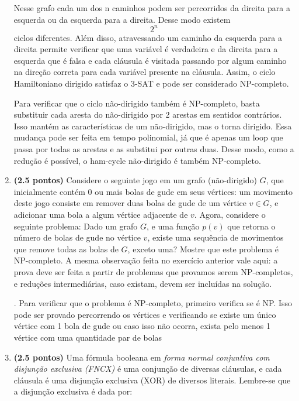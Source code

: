 \documentclass[12pt]{article}
\newcommand{\resposta}[1]{ \noindent {\bf Solução}.{\color{blue} #1}}
\begin{document}
\begin{enumerate}
{Nesse grafo cada um dos n caminhos podem ser percorridos da direita para a esquerda ou da esquerda para a direita. Desse modo existem $$2^n$$ ciclos diferentes. Além disso, atravessando um caminho da esquerda para a direita permite verificar que uma variável é verdadeira e da direita para a esquerda que é falsa e cada cláusula é visitada passando por algum caminho na direção correta para cada variável presente na cláusula. Assim, o ciclo Hamiltoniano dirigido satisfaz o 3-SAT e pode ser considerado NP-completo.

Para verificar que o ciclo não-dirigido também é NP-completo, basta substituir cada aresta do não-dirigido por 2 arestas em sentidos contrários. Isso mantém as características de um não-dirigido, mas o torna dirigido. Essa mudança pode ser feita em tempo polinomial, já que é apenas um loop que passa por todas as arestas e as substitui por outras duas. Desse modo, como a redução é possível, o ham-cycle não-dirigido é também NP-completo.


  }
  
\item {\bf (2.5 pontos)} Considere o seguinte jogo em um grafo
  (não-dirigido) $G$, que inicialmente contém 0 ou mais bolas de gude
  em seus vértices: um movimento deste jogo consiste em remover duas
  bolas de gude de um vértice $v\in G$, e adicionar uma bola a algum
  vértice adjacente de $v$. Agora, considere o seguinte problema: Dado
  um grafo $G$, e uma função $p(v)$ que retorna o número de bolas de
  gude no vértice $v$, existe uma sequência de movimentos que remove
  todas as bolas de $G$, exceto uma? Mostre que este problema é
  NP-completo. A mesma observação feita no exercício anterior vale
  aqui: a prova deve ser feita a partir de problemas que provamos
  serem NP-completos, e reduções intermediárias, caso existam, devem
  ser incluídas na solução.

  \resposta{
    Para verificar que o problema é NP-completo, primeiro verifica se é NP. Isso pode ser provado percorrendo os vértices e verificando se existe um único vértice com 1 bola de gude ou caso isso não ocorra, exista pelo menos 1 vértice com uma quantidade par de bolas  
  }
  
\item {\bf (2.5 pontos)} Uma fórmula booleana em {\it forma normal conjuntiva com disjunção exclusiva (FNCX)} é uma conjunção de diversas cláusulas, e cada cláusula é uma disjunção exclusiva (XOR) de diversos literais. Lembre-se que a disjunção exclusiva é dada por:


\end{enumerate}
\end{document}
